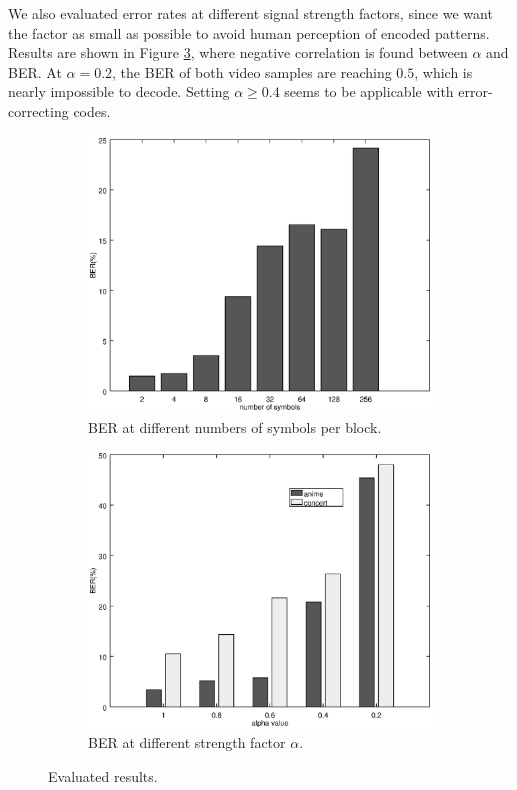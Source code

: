 \documentclass{acm_proc_article-sp}
\begin{document}
We also evaluated error rates at different signal strength factors, since we want the factor as small as possible to avoid human perception of encoded patterns. Results are shown in Figure \ref{fig:ber-alpha}, where negative correlation is found between $\alpha$ and BER. At $\alpha = 0.2$, the BER of both video samples are reaching $0.5$, which is nearly impossible to decode. Setting $\alpha \geq 0.4$ seems to be applicable with error-correcting codes.

\begin{figure}
    \centering
    \begin{subfigure}[b]{0.48\linewidth}
        \includegraphics[width=\linewidth]{figures/ber-symbols}
        \caption{BER at different numbers of symbols per block.}
        \label{fig:ber-symbols}
    \end{subfigure}
    \begin{subfigure}[b]{0.48\linewidth}
        \includegraphics[width=\linewidth]{figures/ber-alpha}
        \caption{BER at different strength factor $\alpha$.}
        \label{fig:ber-alpha}
    \end{subfigure}
    \caption{Evaluated results.}
\end{figure}
\end{document}
